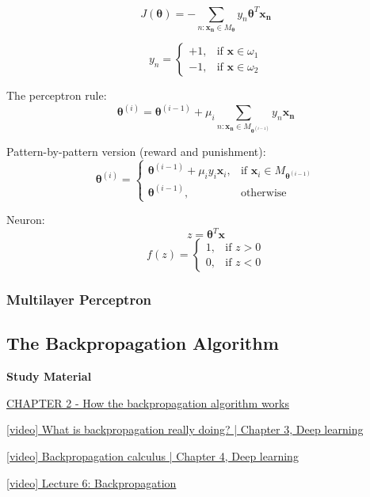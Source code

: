 \documentclass{article}
\begin{document}
\begin{multicols}{2}
\[J(\symbf{\theta}) = - \sum_{n: \symbf{x_n} \in M_{\symbf{\theta}}} y_n \symbf{\theta}^T \symbf{x_n}\]

\[y_n = \begin{cases}
	+1, & \text{if } \symbf{x} \in \omega_1 \\
	-1, & \text{if } \symbf{x} \in \omega_2
\end{cases}\]

The perceptron rule:
\[\symbf{\theta}^{(i)} = \symbf{\theta}^{(i-1)} + \mu_i \sum_{n: \symbf{x_n} \in M_{\symbf{\theta}^{(i-1)}}} y_n \symbf{x_n}\]

Pattern-by-pattern version (reward and punishment):
\[\symbf{\theta}^{(i)} = \begin{cases}
	\symbf{\theta}^{(i-1)} + \mu_i y_i \symbf{x}_i, &\text{if } \symbf{x}_i \in M_{\symbf{\theta}^{(i-1)}} \\
	\symbf{\theta}^{(i-1)}, &\text{otherwise}
\end{cases}\]

Neuron:
\[z = \symbf{\theta}^T \symbf{x}\]
\[f(z) = \begin{cases}
	1, & \text{if } z > 0 \\
	0, & \text{if } z < 0
\end{cases}\]

\subsubsection*{Multilayer Perceptron}

\subsection{The Backpropagation Algorithm}

\begin{mdframed}
	\textbf{Study Material}

	\href{http://neuralnetworksanddeeplearning.com/chap2.html}{CHAPTER 2 - How the backpropagation algorithm works}

	\href{https://www.youtube.com/watch?v=Ilg3gGewQ5U&list=PLZHQObOWTQDNU6R1\_67000Dx\_ZCJB-3pi&index=3}{[video] What is backpropagation really doing? | Chapter 3, Deep learning}

	\href{https://www.youtube.com/watch?v=tIeHLnjs5U8&list=PLZHQObOWTQDNU6R1\_67000Dx\_ZCJB-3pi&index=4}{[video] Backpropagation calculus | Chapter 4, Deep learning}

	\href{https://www.youtube.com/watch?v=dB-u77Y5a6A}{[video] Lecture 6: Backpropagation}


\end{mdframed}
\end{multicols}
\end{document}
